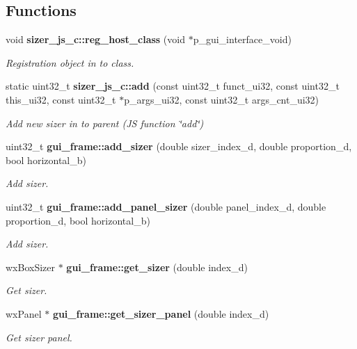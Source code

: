 \subsection*{Functions}
\begin{DoxyCompactItemize}
\item 
void \textbf{ sizer\+\_\+js\+\_\+c\+::reg\+\_\+host\+\_\+class} (void $\ast$p\+\_\+gui\+\_\+interface\+\_\+void)
\begin{DoxyCompactList}\small\item\em Registration object in to class. \end{DoxyCompactList}\item 
static uint32\+\_\+t \textbf{ sizer\+\_\+js\+\_\+c\+::add} (const uint32\+\_\+t funct\+\_\+ui32, const uint32\+\_\+t this\+\_\+ui32, const uint32\+\_\+t $\ast$p\+\_\+args\+\_\+ui32, const uint32\+\_\+t args\+\_\+cnt\+\_\+ui32)
\begin{DoxyCompactList}\small\item\em Add new sizer in to parent (JS function \char`\"{}add\char`\"{}) \end{DoxyCompactList}\item 
uint32\+\_\+t \textbf{ gui\+\_\+frame\+::add\+\_\+sizer} (double sizer\+\_\+index\+\_\+d, double proportion\+\_\+d, bool horizontal\+\_\+b)
\begin{DoxyCompactList}\small\item\em Add sizer. \end{DoxyCompactList}\item 
uint32\+\_\+t \textbf{ gui\+\_\+frame\+::add\+\_\+panel\+\_\+sizer} (double panel\+\_\+index\+\_\+d, double proportion\+\_\+d, bool horizontal\+\_\+b)
\begin{DoxyCompactList}\small\item\em Add sizer. \end{DoxyCompactList}\item 
wx\+Box\+Sizer $\ast$ \textbf{ gui\+\_\+frame\+::get\+\_\+sizer} (double index\+\_\+d)
\begin{DoxyCompactList}\small\item\em Get sizer. \end{DoxyCompactList}\item 
wx\+Panel $\ast$ \textbf{ gui\+\_\+frame\+::get\+\_\+sizer\+\_\+panel} (double index\+\_\+d)
\begin{DoxyCompactList}\small\item\em Get sizer panel. \end{DoxyCompactList}\end{DoxyCompactItemize}
